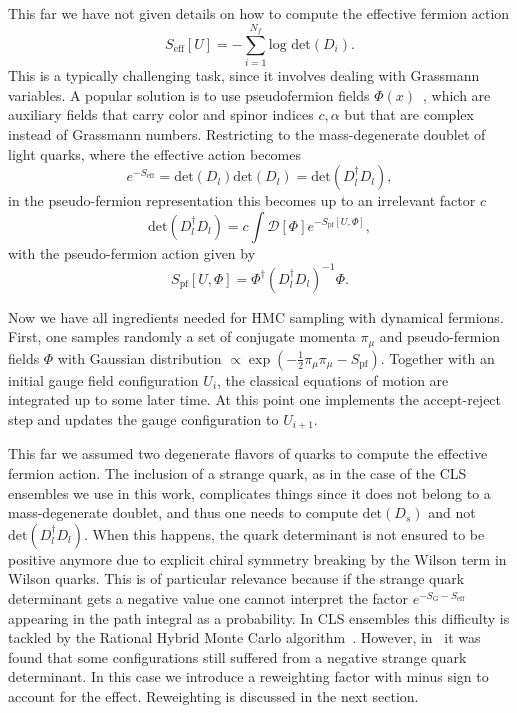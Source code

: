This far we have not given details on how to compute the effective fermion action
\begin{equation}
S_{\textrm{eff}}[U]=-\sum_{i=1}^{N_f}\textrm{log det}(D_i).
\end{equation}
This is a typically challenging task, since it involves dealing with Grassmann variables. A popular solution is to use pseudofermion fields $\Phi(x)$~\citep{Weingarten:1980hx}, which are auxiliary fields that carry color and spinor indices $c,\alpha$ but that are complex instead of Grassmann numbers. Restricting to the mass-degenerate doublet of light quarks, where the effective action becomes
\begin{equation}
e^{-S_{\textrm{eff}}}=\textrm{det}(D_l)\textrm{det}(D_l)=\textrm{det}(D_l^{\dagger}D_l),
\end{equation}
in the pseudo-fermion representation this becomes up to an irrelevant factor $c$
\begin{equation}
\textrm{det}(D_l^{\dagger}D_l)=c\int\mathcal{D}[\Phi]e^{-S_{\textrm{pf}}[U,\Phi]},
\end{equation}
with the pseudo-fermion action given by
\begin{equation}
S_{\textrm{pf}}[U,\Phi]=\Phi^{\dagger}\left(D_l^{\dagger}D_l\right)^{-1}\Phi.
\end{equation}

Now we have all ingredients needed for HMC sampling with dynamical fermions. First, one samples randomly a set of conjugate momenta $\pi_{\mu}$ and pseudo-fermion fields $\Phi$ with Gaussian distribution $\propto\exp\left(-\frac{1}{2}\pi_{\mu}\pi_{\mu}-S_{\textrm{pf}}\right)$. Together with an initial gauge field configuration $U_{i}$, the classical equations of motion are integrated up to some later time. At this point one implements the accept-reject step and updates the gauge configuration to $U_{i+1}$.

This far we assumed two degenerate flavors of quarks to compute the effective fermion action. The inclusion of a strange quark, as in the case of the CLS ensembles we use in this work, complicates things since it does not belong to a mass-degenerate doublet, and thus one needs to compute $\textrm{det}(D_s)$ and not $\textrm{det}(D_l^{\dagger}D_l)$. When this happens, the quark determinant is not ensured to be positive anymore due to explicit chiral symmetry breaking by the Wilson term in Wilson quarks. This is of particular relevance because if the strange quark determinant gets a negative value one cannot interpret the factor $e^{-S_{\textrm{G}}-S_{\textrm{eff}}}$ appearing in the path integral as a probability. In CLS ensembles this difficulty is tackled by the Rational Hybrid Monte Carlo algorithm~\citep{Kennedy:1998cu,Clark:2006fx}. However, in~\citep{Mohler:2020txx} it was found that some configurations still suffered from a negative strange quark determinant. In this case we introduce a reweighting factor with minus sign to account for the effect. Reweighting is discussed in the next section.


